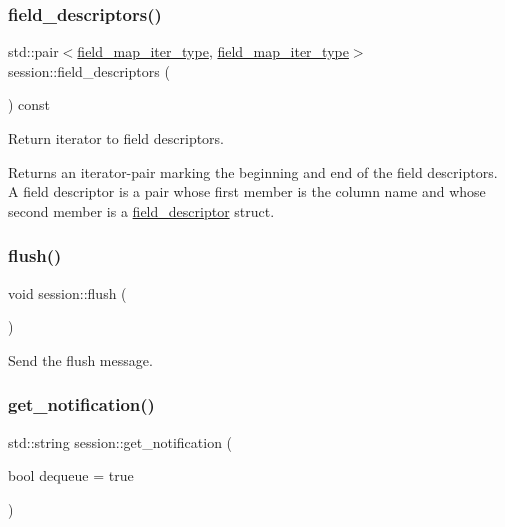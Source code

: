 \subsubsection{\texorpdfstring{field\+\_\+descriptors()}{field\_descriptors()}}
{\footnotesize\ttfamily std\+::pair$<$\hyperlink{classsession_a1124fe81d0a0c740c46f101818980aff}{field\+\_\+map\+\_\+iter\+\_\+type}, \hyperlink{classsession_a1124fe81d0a0c740c46f101818980aff}{field\+\_\+map\+\_\+iter\+\_\+type}$>$ session\+::field\+\_\+descriptors (\begin{DoxyParamCaption}{ }\end{DoxyParamCaption}) const\hspace{0.3cm}{\ttfamily [inline]}}



Return iterator to field descriptors. 

Returns an iterator-\/pair marking the beginning and end of the field descriptors. A field descriptor is a pair whose first member is the column name and whose second member is a \hyperlink{structsession_1_1field__descriptor}{field\+\_\+descriptor} struct. \mbox{\label{classsession_a4b07d4a40633e6e63ff784a0af69210c}} 
\subsubsection{\texorpdfstring{flush()}{flush()}}
{\footnotesize\ttfamily void session\+::flush (\begin{DoxyParamCaption}{ }\end{DoxyParamCaption})\hspace{0.3cm}{\ttfamily [inline]}}



Send the flush message. 

\mbox{\label{classsession_ad0c8821300a53f8a953081cd01d54d72}} 
\subsubsection{\texorpdfstring{get\+\_\+notification()}{get\_notification()}}
{\footnotesize\ttfamily std\+::string session\+::get\+\_\+notification (\begin{DoxyParamCaption}\item[{bool}]{dequeue = {\ttfamily true} }\end{DoxyParamCaption})\hspace{0.3cm}{\ttfamily [inline]}}



